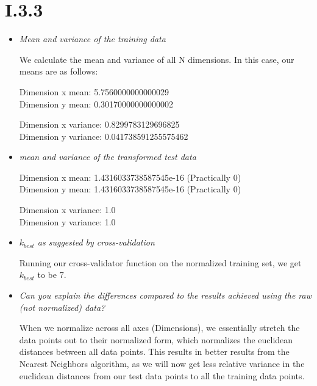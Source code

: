 \documentclass[12pt, a4paper]{article}
\begin{document}
\section{I.3.3}
\begin{itemize}
\item \textit{Mean and variance of the training data}

We calculate the mean and variance of all N dimensions. In this case, our means are as follows:

Dimension x mean: 5.7560000000000029 \\
Dimension y mean: 0.30170000000000002

Dimension x variance: 0.8299783129696825 \\
Dimension y variance: 0.041738591255575462

\item \textit{mean and variance of the transformed test data}

Dimension x mean: 1.4316033738587545e-16 (Practically 0) \\
Dimension y mean: 1.4316033738587545e-16 (Practically 0)

Dimension x variance: 1.0 \\
Dimension y variance: 1.0

\item \textit{$k_{best}$ as suggested by cross-validation}

Running our cross-validator function on the normalized training set, we get $k_{best}$ to be $7$.

\item \textit{Can you explain the differences compared to the results achieved using the raw (not normalized) data?}

When we normalize across all axes (Dimensions), we essentially stretch the data points out to their normalized form, which normalizes the euclidean distances between all data points. This results in better results from the Nearest Neighbors algorithm, as we will now get less relative variance in the euclidean distances from our test data points to all the training data points.

\end{itemize}
\end{document}
